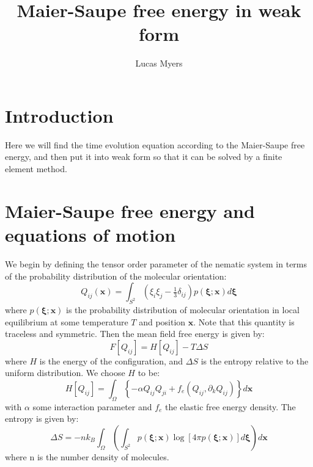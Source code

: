 \documentclass[reqno]{article}
\begin{document}
	\title{Maier-Saupe free energy in weak form}
	\author{Lucas Myers}
	\maketitle
	
	\section{Introduction}
	Here we will find the time evolution equation according to the Maier-Saupe free energy, and then put it into weak form so that it can be solved by a finite element method.
	
	\section{Maier-Saupe free energy and equations of motion}
	We begin by defining the tensor order parameter of the nematic system in terms of the probability distribution of the molecular orientation:
	\begin{equation} \label{eq:Q-def}
		Q_{ij} (\mathbf{x}) 
		= \int_{S^2} \left( \xi_i \xi_j - \tfrac13 \delta_{ij} \right)
		p(\mathbf{\xi} ; \mathbf{x}) d \mathbf{\xi}
	\end{equation}
	where $p(\mathbf{\xi} ; \mathbf{x})$ is the probability distribution of molecular orientation in local equilibrium at some temperature $T$ and position $\mathbf{x}$. 
	Note that this quantity is traceless and symmetric.
	Then the mean field free energy is given by:
	\begin{equation}
		F \left[ Q_{ij} \right] = H \left[ Q_{ij} \right] - T \Delta S
	\end{equation}
	where $H$ is the energy of the configuration, and $\Delta S$ is the entropy relative to the uniform distribution.
	We choose $H$ to be:
	\begin{equation}
		H\left[ Q_{ij} \right]
		= \int_{\Omega} \left\{ -\alpha Q_{ij} Q_{ji} + f_e 	\left( Q_{ij}, \partial_k Q_{ij} \right) \right\} d \mathbf{x}
	\end{equation}
	with $\alpha$ some interaction parameter and $f_e$ the elastic free energy density.
	The entropy is given by:
	\begin{equation} \label{eq:entropy-def}
		\Delta S 
		= -n k_B \int_{\Omega} \left(
		\int_{S^2} p(\mathbf{\xi} ; \mathbf{x}) 
		\log \left[ 4 \pi p( \mathbf{\xi} ; \mathbf{x} ) \right] d \mathbf{\xi} \right) d \mathbf{x}
	\end{equation}
	where n is the number density of molecules.
\end{document}
